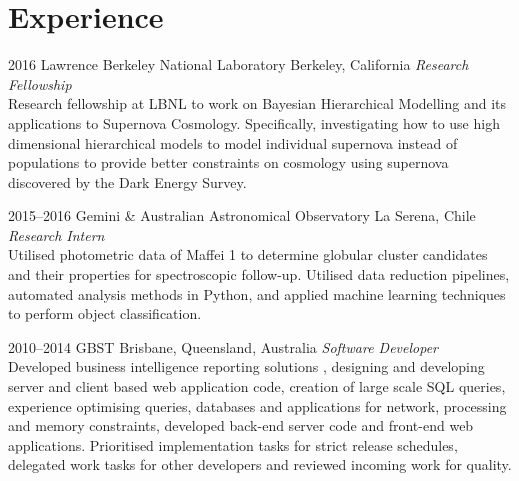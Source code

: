 \documentclass[]{friggeri-cv} %
\begin{document}
\section{Experience}

\begin{entrylist}

\entry
{2016}
{Lawrence Berkeley National Laboratory}
{Berkeley, California}
{\emph{Research Fellowship} \\
	Research fellowship at LBNL to work on Bayesian Hierarchical Modelling and its applications to Supernova Cosmology. Specifically, investigating how to use high dimensional hierarchical models to model individual supernova instead of populations to provide better constraints on cosmology using supernova discovered by the Dark Energy Survey.}


\entry
{2015--2016}
{Gemini \& Australian Astronomical Observatory}
{La Serena, Chile}
{\emph{Research Intern} \\
Utilised photometric data of Maffei 1 to determine globular cluster candidates and their properties for spectroscopic follow-up. Utilised data reduction pipelines, automated analysis methods in Python, and applied machine learning techniques to perform object classification.}

\entry
{2010--2014}
{GBST}
{Brisbane, Queensland, Australia}
{\emph{Software Developer} \\
Developed business intelligence reporting solutions , designing and developing server and client based web application code, creation of large scale SQL queries, experience optimising queries, databases and applications for network, processing and memory constraints, developed back-end server code and front-end web applications. Prioritised implementation tasks for strict release schedules, delegated work tasks for other developers and reviewed incoming work for quality.}


\end{entrylist}
\end{document}
